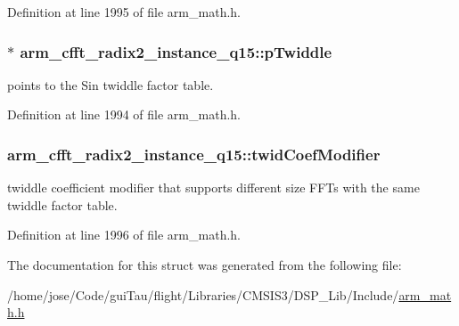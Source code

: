 Definition at line 1995 of file arm\-\_\-math.\-h.

\hypertarget{structarm__cfft__radix2__instance__q15_a3809dd15e7cbf1a054c728cfbbb0cc5a}{
\subsubsection[{p\-Twiddle}]{$\ast$ arm\-\_\-cfft\-\_\-radix2\-\_\-instance\-\_\-q15\-::p\-Twiddle}}\label{structarm__cfft__radix2__instance__q15_a3809dd15e7cbf1a054c728cfbbb0cc5a}
points to the Sin twiddle factor table. 

Definition at line 1994 of file arm\-\_\-math.\-h.

\hypertarget{structarm__cfft__radix2__instance__q15_a6f2ab87fb4c568656e1f92f687b5c850}{
\subsubsection[{twid\-Coef\-Modifier}]{ arm\-\_\-cfft\-\_\-radix2\-\_\-instance\-\_\-q15\-::twid\-Coef\-Modifier}}\label{structarm__cfft__radix2__instance__q15_a6f2ab87fb4c568656e1f92f687b5c850}
twiddle coefficient modifier that supports different size F\-F\-Ts with the same twiddle factor table. 

Definition at line 1996 of file arm\-\_\-math.\-h.



The documentation for this struct was generated from the following file\-:\begin{DoxyCompactItemize}
\item 
/home/jose/\-Code/gui\-Tau/flight/\-Libraries/\-C\-M\-S\-I\-S3/\-D\-S\-P\-\_\-\-Lib/\-Include/\hyperlink{arm__math_8h}{arm\-\_\-math.\-h}\end{DoxyCompactItemize}
